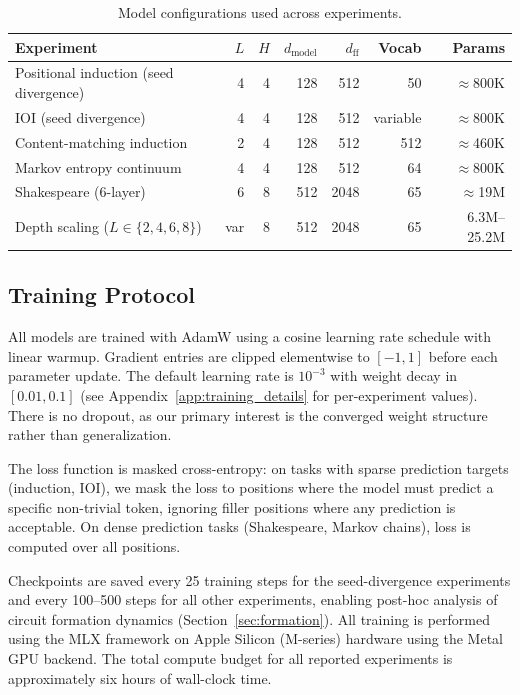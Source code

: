 \begin{table}[h]
\centering
\caption{Model configurations used across experiments.}
\label{tab:model_configs}
\begin{tabular}{lrrrrrr}
\toprule
Experiment & $L$ & $H$ & $d_{\text{model}}$ & $d_{\text{ff}}$ & Vocab & Params \\
\midrule
Positional induction (seed divergence) & 4 & 4 & 128 & 512 & 50 & $\approx$800K \\
IOI (seed divergence) & 4 & 4 & 128 & 512 & variable & $\approx$800K \\
Content-matching induction & 2 & 4 & 128 & 512 & 512 & $\approx$460K \\
Markov entropy continuum & 4 & 4 & 128 & 512 & 64 & $\approx$800K \\
Shakespeare (6-layer) & 6 & 8 & 512 & 2048 & 65 & $\approx$19M \\
Depth scaling ($L \in \{2,4,6,8\}$) & var & 8 & 512 & 2048 & 65 & 6.3M--25.2M \\
\bottomrule
\end{tabular}
\end{table}

\subsection{Training Protocol}
\label{sec:training}

All models are trained with AdamW \cite{loshchilov2018decoupled} using a cosine learning rate
schedule with linear warmup. Gradient entries are clipped elementwise to $[-1, 1]$ before
each parameter update. The default learning rate is $10^{-3}$ with weight decay in $[0.01, 0.1]$
(see Appendix~\ref{app:training_details} for per-experiment values). There is no dropout, as our
primary interest is the converged weight structure rather than generalization.

The loss function is masked cross-entropy: on tasks with sparse prediction targets (induction,
IOI), we mask the loss to positions where the model must predict a specific non-trivial token,
ignoring filler positions where any prediction is acceptable. On dense prediction tasks
(Shakespeare, Markov chains), loss is computed over all positions.

Checkpoints are saved every 25 training steps for the seed-divergence experiments and every
100--500 steps for all other experiments, enabling post-hoc analysis of circuit formation
dynamics (Section~\ref{sec:formation}). All training is performed using the MLX framework
\cite{mlx2023} on Apple Silicon (M-series) hardware using the Metal GPU backend.
The total compute budget for all reported experiments is approximately six hours of wall-clock time.

